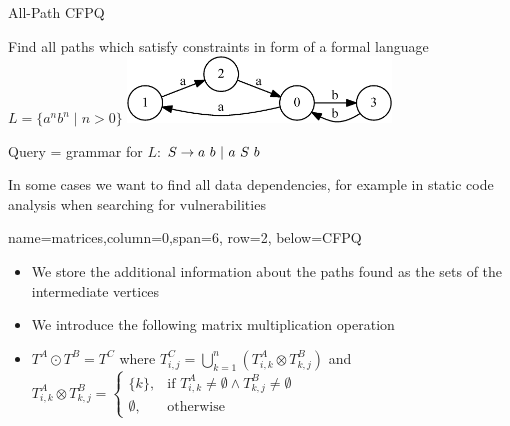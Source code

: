 \documentclass[a0paper,landscape]{baposter}
\begin{document}
\begin{poster}
\begin{posterbox}[name=CFPQ,column=0,row=0, span=4]{All-Path CFPQ}

  Find all paths which satisfy constraints in form of a formal language $L=\{a^n b^n \mid n > 0\}$
    \includegraphics[width=7cm]{example_graph_transparent.png}

    Query = grammar for $L$: $S  \rightarrow a  \ b \ | \ a \ S \ b  \\$

  In some cases we want to find all data dependencies, for example in static code analysis when
  searching for vulnerabilities

\end{posterbox}

{name=matrices,column=0,span=6, row=2, below=CFPQ}%
{
	
	\begin{itemize}
		\item We store the additional information about the paths found as the sets of the intermediate vertices
		\item We introduce the following matrix multiplication operation
		\item $T^A \odot T^B = T^C$ where $T^C_{i,j} = \bigcup^{n}_{k = 1} (T^A_{i,k} \otimes T^B_{k,j})$ and   $T^A_{i,k} \otimes T^B_{k,j} = \begin{cases} \{k\}, & \mbox{if } T^A_{i,k} \neq \emptyset \wedge T^B_{k,j} \neq \emptyset \\ \emptyset, & \mbox{otherwise} \end{cases}$
	\end{itemize}

}



\end{poster}
\end{document}
